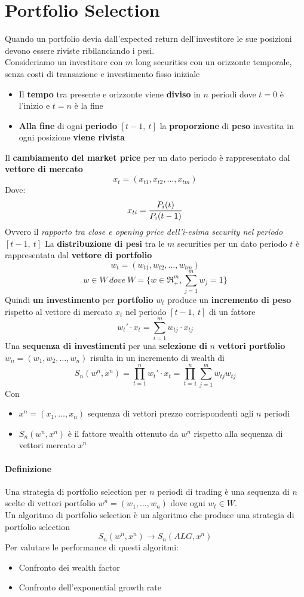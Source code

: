 \documentclass[12pt]{article}
\begin{document}
\section{Portfolio Selection}
Quando un portfolio devia dall'expected return dell'investitore le sue posizioni devono essere riviste ribilanciando i pesi.\\[12pt]
Consideriamo un investitore con $m$ long securities con un orizzonte temporale, senza costi di transazione e investimento fisso iniziale
\begin{itemize}
    \item Il \textbf{tempo} tra presente e orizzonte viene \textbf{diviso} in $n$ periodi dove $t=0$ è l'inizio e $t=n$ è la fine
    \item \textbf{Alla fine} di ogni \textbf{periodo} $[t-1, \ t]$ la \textbf{proporzione} di \textbf{peso} investita in ogni posizione \textbf{viene rivista}
\end{itemize}
Il \textbf{cambiamento del market price} per un dato periodo è rappresentato dal \textbf{vettore di mercato}
$$x_t=(x_{t1},x_{t2},\dots,x_{tm})$$
Dove:
$$x_{ti}={{P_i(t)}\over{P_i(t-1)}}$$
Ovvero il \textit{rapporto tra close e opening price dell'i-esima security nel periodo}  $[t-1, \ t]$
La \textbf{distribuzione di pesi} tra le $m$ securities per un dato periodo $t$ è rappresentata dal \textbf{vettore di portfolio}
$$w_t=(w_{t1},w_{t2},\dots,w_{tm})$$
$$w\in W \ dove \ W=\{w\in \Re_+^m, \sum_{j=1}^m w_j=1\}$$
Quindi \textbf{un investimento} per \textbf{portfolio} $w_t$ produce un \textbf{incremento di peso} rispetto al vettore di mercato $x_t$ nel periodo $[t-1, \ t]$ di un fattore
$$w_t'\cdot x_t=\sum_{i=1}^mw_{tj}\cdot x_{tj}$$
Una \textbf{sequenza di investimenti} per una \textbf{selezione di} $n$ \textbf{vettori portfolio} $w_n=(w_1,w_2,\dots,w_n)$ risulta in un incremento di wealth di
$$S_n(w^n,x^n)=\prod_{t=1}^nw_t'\cdot x_t=\prod_{t=1}^n\sum_{j=1}^mw_{tj}w_{tj}$$
Con
\begin{itemize}
    \item $x^n=(x_1,\dots,x_n)$ sequenza di vettori prezzo corrispondenti agli $n$ periodi
    \item $S_n(w^n,x^n)$ è il fattore wealth ottenuto da $w^n$ rispetto alla sequenza di vettori mercato $x^n$
\end{itemize}
\paragraph{Definizione} Una strategia di portfolio selection per $n$ periodi di trading è una sequenza di $n$ scelte di vettori portfolio $w^n=(w_1,\dots,w_n)$ dove ogni $w_t\in W$.
\\Un algoritmo di portfolio selection è un algoritmo che produce una strategia di portfolio selection
$$S_n(w^n,x^n)\rightarrow S_n(ALG, x^n)$$
Per valutare le performance di questi algoritmi:
\begin{itemize}
    \item Confronto dei wealth factor
    \item Confronto dell'exponential growth rate
\end{itemize}
\end{document}
